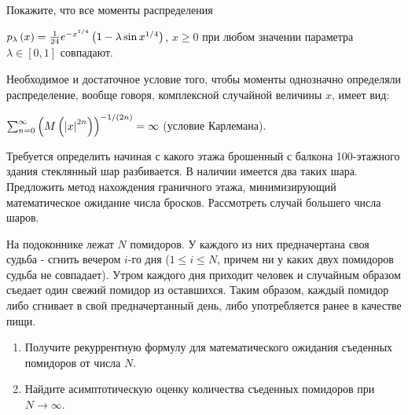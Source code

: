 \begin{problem}

Покажите, что все моменты распределения

 $p_{\lambda } \left(x\right)=\frac{1}{24} e^{-x^{{1\mathord{\left/ {\vphantom {1 4}} \right. \kern-\nulldelimiterspace} 4} } } \left(1-\lambda \sin x^{{1\mathord{\left/ {\vphantom {1 4}} \right. \kern-\nulldelimiterspace} 4} } \right)$, $x\ge 0$ при любом значении параметра $\lambda \in \left[0,1\right]$ совпадают.

\begin{remark}

Необходимое и достаточное условие того, чтобы моменты однозначно определяли распределение, вообще говоря, комплексной случайной величины $x$, имеет вид:

\noindent $\sum _{n=0}^{\infty }\left(M\left(\left|x\right|^{2n} \right)\right)^{{-1\mathord{\left/ {\vphantom {-1 \left(2n\right)}} \right. \kern-\nulldelimiterspace} \left(2n\right)} } =\infty  $ (условие Карлемана).
\end{remark}

\end{problem} 

\begin{problem}

Требуется определить начиная с какого этажа брошенный с балкона 100-этажного здания стеклянный шар разбивается. В наличии имеется два таких шара. Предложить метод нахождения граничного этажа, минимизирующий математическое ожидание числа бросков. Рассмотреть случай большего числа шаров.  

\end{problem}

\begin{problem}
На подоконнике лежат $N$ помидоров. У каждого из них предначертана своя судьба - сгнить вечером $i$-го дня ($1 \leqslant i \leqslant N$, причем ни у каких двух помидоров судьба не совпадает). Утром каждого дня приходит человек и случайным образом съедает один свежий помидор из оставшихся. Таким образом, каждый помидор либо сгнивает в свой предначертанный день, либо употребляется ранее в качестве пищи.

\begin{enumerate}
\item Получите рекуррентную формулу для математического ожидания съеденных помидоров от числа $N$.
\item Найдите асимптотическую оценку количества съеденных помидоров при $N \rightarrow \infty$.
\end{enumerate}

\end{problem}

